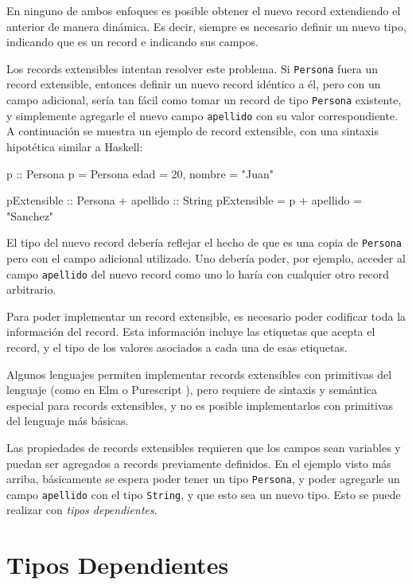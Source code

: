 En ninguno de ambos enfoques es posible obtener el nuevo record extendiendo el anterior de manera dinámica. Es decir, siempre es necesario definir un nuevo tipo, indicando que es un record e indicando sus campos.

Los records extensibles intentan resolver este problema. Si \texttt{Persona} fuera un record extensible, entonces definir un nuevo record idéntico a él, pero con un campo adicional, sería tan fácil como tomar un record de tipo \texttt{Persona} existente, y simplemente agregarle el nuevo campo \texttt{apellido} con su valor correspondiente. A continuación se muestra un ejemplo de record extensible, con una sintaxis hipotética similar a Haskell:

\begin{code}
p :: Persona
p = Persona { edad = 20, nombre = "Juan" }

pExtensible :: Persona + { apellido :: String }
pExtensible = p + { apellido = "Sanchez" }
\end{code}

El tipo del nuevo record debería reflejar el hecho de que es una copia de \texttt{Persona} pero con el campo adicional utilizado. Uno debería poder, por ejemplo, acceder al campo \texttt{apellido} del nuevo record como uno lo haría con cualquier otro record arbitrario.

Para poder implementar un record extensible, es necesario poder codificar toda la información del record. Esta información incluye las etiquetas que acepta el record, y el tipo de los valores asociados a cada una de esas etiquetas. 

Algunos lenguajes permiten implementar records extensibles con primitivas del lenguaje (como en Elm \cite{ElmRecords} o Purescript \cite{PurescriptRecords}), pero requiere de sintaxis y semántica especial para records extensibles, y no es posible implementarlos con primitivas del lenguaje más básicas. 

Las propiedades de records extensibles requieren que los campos sean variables y puedan ser agregados a records previamente definidos. En el ejemplo visto más arriba, básicamente se espera poder tener un tipo \texttt{Persona}, y poder agregarle un campo \texttt{apellido} con el tipo \texttt{String}, y que esto sea un nuevo tipo. Esto se puede realizar con \textit{tipos dependientes}.

\section{Tipos Dependientes}

